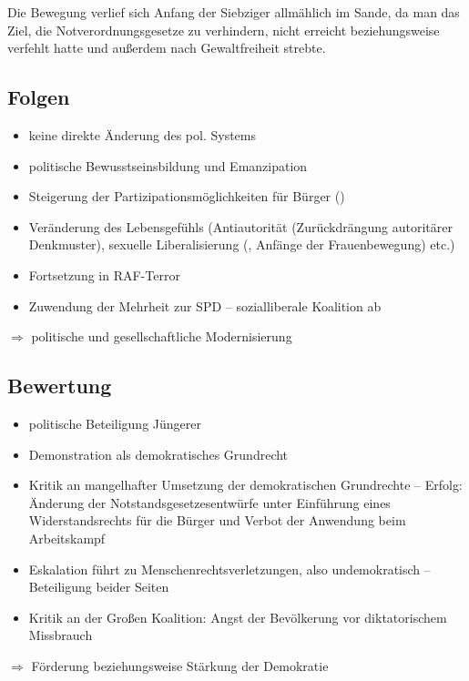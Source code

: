 Die Bewegung verlief sich Anfang der Siebziger allmählich im Sande, da
man das Ziel, die Notverordnungsgesetze zu verhindern, nicht erreicht
beziehungsweise verfehlt hatte und außerdem nach Gewaltfreiheit
strebte.

\subsection*{Folgen}

\begin{itemize}
\item keine direkte Änderung des pol. Systems
\item politische Bewusstseinsbildung und Emanzipation
\item Steigerung der Partizipationsmöglichkeiten für Bürger ()
\item Veränderung des Lebensgefühls (Antiautorität (Zurückdrängung
autoritärer Denkmuster), sexuelle
Liberalisierung (, Anfänge der Frauenbewegung) etc.)
\item Fortsetzung in RAF-Terror
\item Zuwendung der Mehrheit zur SPD -- sozialliberale Koalition ab
\end{itemize}

\noindent $\Longrightarrow$ politische und gesellschaftliche
Modernisierung

\subsection*{Bewertung}

\begin{itemize}
\item politische Beteiligung Jüngerer
\item Demonstration als demokratisches Grundrecht
\item Kritik an mangelhafter Umsetzung der demokratischen Grundrechte
-- Erfolg: Änderung der Notstandsgesetzesentwürfe unter Einführung
eines Widerstandsrechts für die Bürger und Verbot der Anwendung beim
Arbeitskampf
\item Eskalation führt zu Menschenrechtsverletzungen, also
undemokratisch -- Beteiligung beider Seiten
\item Kritik an der Großen Koalition: Angst der Bevölkerung vor
diktatorischem Missbrauch
\end{itemize}

\noindent $\Longrightarrow$ Förderung beziehungsweise Stärkung der
Demokratie



\endinput

